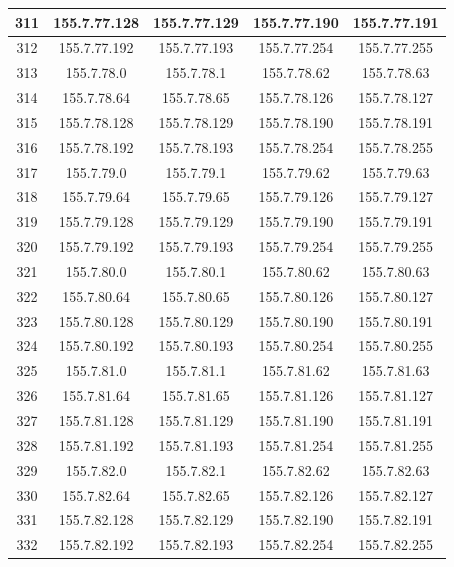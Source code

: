\documentclass[letterpaper,12pt]{article}
\begin{document}
\begin{longtable}{|c|c|c|c|c|}
        311 & 155.7.77.128 & 155.7.77.129 & 155.7.77.190 & 155.7.77.191 \\ \hline
        312 & 155.7.77.192 & 155.7.77.193 & 155.7.77.254 & 155.7.77.255 \\ \hline
        313 & 155.7.78.0 & 155.7.78.1 & 155.7.78.62 & 155.7.78.63 \\ \hline
        314 & 155.7.78.64 & 155.7.78.65 & 155.7.78.126 & 155.7.78.127 \\ \hline
        315 & 155.7.78.128 & 155.7.78.129 & 155.7.78.190 & 155.7.78.191 \\ \hline
        316 & 155.7.78.192 & 155.7.78.193 & 155.7.78.254 & 155.7.78.255 \\ \hline
        317 & 155.7.79.0 & 155.7.79.1 & 155.7.79.62 & 155.7.79.63 \\ \hline
        318 & 155.7.79.64 & 155.7.79.65 & 155.7.79.126 & 155.7.79.127 \\ \hline
        319 & 155.7.79.128 & 155.7.79.129 & 155.7.79.190 & 155.7.79.191 \\ \hline
        320 & 155.7.79.192 & 155.7.79.193 & 155.7.79.254 & 155.7.79.255 \\ \hline
        321 & 155.7.80.0 & 155.7.80.1 & 155.7.80.62 & 155.7.80.63 \\ \hline
        322 & 155.7.80.64 & 155.7.80.65 & 155.7.80.126 & 155.7.80.127 \\ \hline
        323 & 155.7.80.128 & 155.7.80.129 & 155.7.80.190 & 155.7.80.191 \\ \hline
        324 & 155.7.80.192 & 155.7.80.193 & 155.7.80.254 & 155.7.80.255 \\ \hline
        325 & 155.7.81.0 & 155.7.81.1 & 155.7.81.62 & 155.7.81.63 \\ \hline
        326 & 155.7.81.64 & 155.7.81.65 & 155.7.81.126 & 155.7.81.127 \\ \hline
        327 & 155.7.81.128 & 155.7.81.129 & 155.7.81.190 & 155.7.81.191 \\ \hline
        328 & 155.7.81.192 & 155.7.81.193 & 155.7.81.254 & 155.7.81.255 \\ \hline
        329 & 155.7.82.0 & 155.7.82.1 & 155.7.82.62 & 155.7.82.63 \\ \hline
        330 & 155.7.82.64 & 155.7.82.65 & 155.7.82.126 & 155.7.82.127 \\ \hline
        331 & 155.7.82.128 & 155.7.82.129 & 155.7.82.190 & 155.7.82.191 \\ \hline
        332 & 155.7.82.192 & 155.7.82.193 & 155.7.82.254 & 155.7.82.255 \\ \hline

\end{longtable}
\end{document}
